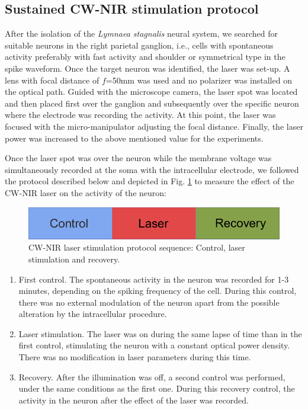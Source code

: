 
\subsection{Sustained CW-NIR stimulation protocol}
\label{sect:sustained-protocol}
After the isolation of the \textit{Lymnaea stagnalis} neural system, we searched for suitable neurons in the right parietal ganglion, i.e., cells with spontaneous activity preferably with fast activity and shoulder or symmetrical type in the spike waveform. 
Once the target neuron was identified, the laser was set-up. A lens with focal distance of $f$=50mm was used and no polarizer was installed on the optical path. Guided with the microscope camera, the laser spot was located and then placed first over the ganglion and subsequently over the specific neuron where the electrode was recording the activity. 
At this point, the laser was focused with the micro-manipulator adjusting the focal distance. Finally, the laser power was increased to the above mentioned value for the experiments.

Once the laser spot was over the neuron while the membrane voltage was simultaneously recorded at the soma with the intracellular electrode, we followed the protocol described below and depicted in Fig. \ref{fig:protocol scheme} to measure the effect of the CW-NIR laser on the activity of the neuron:

\begin{figure}[htb!]
	\includegraphics[width=\textwidth]{img/laser/trial-protocol.pdf}
	\caption{CW-NIR laser stimulation protocol sequence: Control, laser stimulation and recovery.}
	\label{fig:protocol scheme}
\end{figure}

\begin{enumerate}
	\item First control. The spontaneous activity in the neuron was recorded for 1-3 minutes, depending on the spiking frequency of the cell. During this control, there was no external modulation of the neuron apart from the possible alteration by the intracellular procedure.  
	\item Laser stimulation. The laser was on during the same lapse of time than in the first control, stimulating the neuron with a constant optical power density. There was no modification in laser parameters during this time.
	\item Recovery. After the illumination was off, a second control was performed, under the same conditions as the first one. During this recovery control, the activity in the neuron after the effect of the laser was recorded.
\end{enumerate}



